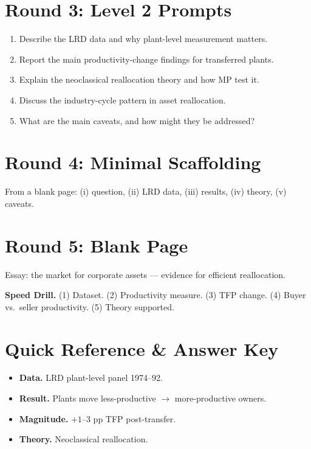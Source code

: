 \documentclass[11pt]{article}
\begin{document}
\section*{Round 3: Level 2 Prompts}
\begin{enumerate}
\item Describe the LRD data and why plant-level measurement matters.
\item Report the main productivity-change findings for transferred plants.
\item Explain the neoclassical reallocation theory and how MP test it.
\item Discuss the industry-cycle pattern in asset reallocation.
\item What are the main caveats, and how might they be addressed?
\end{enumerate}

\section*{Round 4: Minimal Scaffolding}
From a blank page: (i) question, (ii) LRD data, (iii) results, (iv) theory, (v) caveats.

\section*{Round 5: Blank Page}
Essay: the market for corporate assets --- evidence for efficient reallocation.

\vspace{6pt}
\begin{drillbox}
\textbf{Speed Drill.} (1) Dataset. (2) Productivity measure. (3) TFP change. (4) Buyer vs.\ seller productivity. (5) Theory supported.
\end{drillbox}

\section*{Quick Reference \& Answer Key}
\begin{answerbox}
\begin{itemize}
\item \textbf{Data.} LRD plant-level panel 1974--92.
\item \textbf{Result.} Plants move less-productive $\to$ more-productive owners.
\item \textbf{Magnitude.} $+1$--$3$ pp TFP post-transfer.
\item \textbf{Theory.} Neoclassical reallocation.
\end{itemize}
\end{answerbox}
\end{document}
